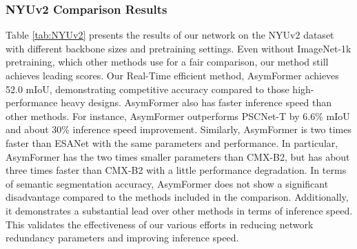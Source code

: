 \documentclass[letterpaper, 10 pt, conference]{ieeeconf}
\begin{document}
\subsubsection{NYUv2 Comparison Results}
Table \ref{tab:NYUv2} presents the results of our network on the NYUv2 dataset with different backbone sizes and pretraining settings. Even without ImageNet-1k pretraining, which other methods use for a fair comparison, our method still achieves leading scores. Our Real-Time efficient method, AsymFormer achieves 52.0  mIoU, demonstrating competitive accuracy compared to those high-performance heavy designs. AsymFormer also has faster inference speed than other methods. For instance, AsymFormer outperforms PSCNet-T\cite{du2022pscnet} by 6.6\% mIoU and about 30\% inference speed improvement. Similarly, AsymFormer is two times faster than ESANet\cite{seichter2021efficient} with the same parameters and performance. In particular, AsymFormer has the two times smaller parameters than CMX-B2\cite{liu2022cmx}, but has about three times faster than CMX-B2 with a little performance degradation. In terms of semantic segmentation accuracy, AsymFormer does not show a significant disadvantage compared to the methods included in the comparison. Additionally, it demonstrates a substantial lead over other methods in terms of inference speed. This validates the effectiveness of our various efforts in reducing network redundancy parameters and improving inference speed.
\end{document}
